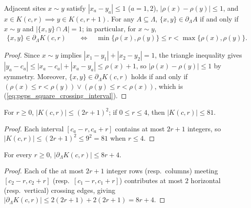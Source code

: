 \begin{lemma}
    \label{thm:peps_square_crossing_interval}
    \leanok
    Adjacent sites $x\sim y$ satisfy $|x_a-y_a|\le1$ ($a=1,2$), $|\rho(x)-\rho(y)|\le1$, and $x\in K(c,r)\implies y\in K(c,r+1)$. For any $A\subseteq\Lambda$, $\{x,y\}\in\partial_\Lambda A$ if and only if $x\sim y$ and $|\{x,y\}\cap A|=1$; in particular, for $x\sim y$,
    \begin{align}
        \{x,y\}\in\partial_\Lambda K(c,r)
         & \quad\Longleftrightarrow\quad
        \min\{\rho(x),\rho(y)\}\le r<\max\{\rho(x),\rho(y)\}.
        \label{eq:peps_square_crossing_interval}
    \end{align}
\end{lemma}
\begin{proof}\leanok
    Since $x\sim y$ implies $|x_1-y_1|+|x_2-y_2|=1$, the triangle inequality gives $|y_a-c_a|\le|x_a-c_a|+|x_a-y_a|\le\rho(x)+1$, so $|\rho(x)-\rho(y)|\le1$ by symmetry. Moreover, $\{x,y\}\in\partial_\Lambda K(c,r)$ holds if and only if $(\rho(x)\le r<\rho(y))\vee(\rho(y)\le r<\rho(x))$, which is (\ref{eq:peps_square_crossing_interval}).
\end{proof}

\begin{lemma}
    \label{thm:peps_closed_square_card}
    \leanok
    For $r\ge0$, $|K(c,r)|\le(2r+1)^2$; if $0\le r\le4$, then $|K(c,r)|\le81$.
\end{lemma}
\begin{proof}\leanok
    Each interval $[c_a-r,c_a+r]$ contains at most $2r+1$ integers, so $|K(c,r)|\le(2r+1)^2\le 9^2=81$ when $r\le4$.
\end{proof}

\begin{lemma}
    \label{thm:peps_closed_square_boundary}
    \leanok
    For every $r\ge0$, $|\partial_\Lambda K(c,r)|\le8r+4$.
\end{lemma}
\begin{proof}\leanok
    Each of the at most $2r+1$ integer rows (resp.\ columns) meeting $[c_2-r,c_2+r]$ (resp.\ $[c_1-r,c_1+r]$) contributes at most $2$ horizontal (resp.\ vertical) crossing edges, giving $|\partial_\Lambda K(c,r)|\le 2(2r+1)+2(2r+1)=8r+4$.
\end{proof}


